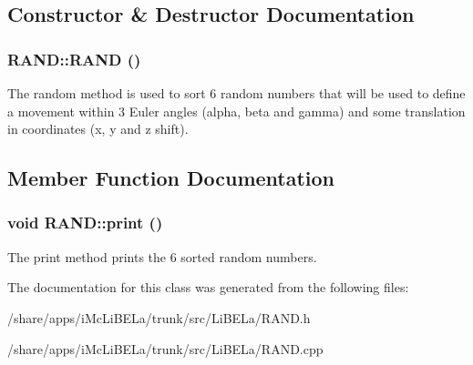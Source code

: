 \subsection{Constructor \& Destructor Documentation}
\hypertarget{classRAND_a9a7b436daf559318824a9c4b2d534a26}{
\subsubsection[{RAND}]{\setlength{\rightskip}{0pt plus 5cm}RAND::RAND ()}}
\label{classRAND_a9a7b436daf559318824a9c4b2d534a26}
The random method is used to sort 6 random numbers that will be used to define a movement within 3 Euler angles (alpha, beta and gamma) and some translation in coordinates (x, y and z shift). 

\subsection{Member Function Documentation}
\hypertarget{classRAND_a2b19a2b6cc533fb1e0858cb3059701c1}{
\subsubsection[{print}]{\setlength{\rightskip}{0pt plus 5cm}void RAND::print ()}}
\label{classRAND_a2b19a2b6cc533fb1e0858cb3059701c1}
The print method prints the 6 sorted random numbers. 

The documentation for this class was generated from the following files:\begin{DoxyCompactItemize}
\item 
/share/apps/iMcLiBELa/trunk/src/LiBELa/RAND.h\item 
/share/apps/iMcLiBELa/trunk/src/LiBELa/RAND.cpp\end{DoxyCompactItemize}
